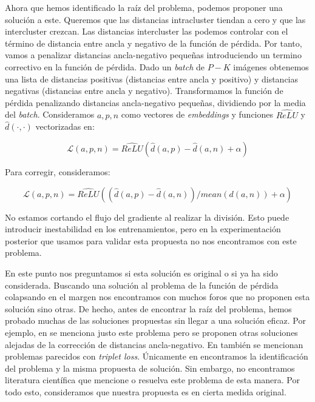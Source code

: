 Ahora que hemos identificado la raíz del problema, podemos proponer una solución a este. Queremos que las distancias intracluster tiendan a cero y que las intercluster crezcan. Las distancias intercluster las podemos controlar con el término de distancia entre ancla y negativo de la función de pérdida. Por tanto, vamos a penalizar distancias ancla-negativo pequeñas introduciendo un termino correctivo en la función de pérdida. Dado un \textit{batch} de $P-K$ imágenes obtenemos una lista de distancias positivas (distancias entre ancla y positivo) y distancias negativas (distancias entre ancla y negativo). Transformamos la función de pérdida penalizando distancias ancla-negativo pequeñas, dividiendo por la media del \textit{batch}. Consideramos $a, p, n$ como vectores de \textit{embeddings} y funciones $\widehat{ReLU}$ y $\widehat{d}(\cdot, \cdot)$ vectorizadas en:

\begin{equation}
    \mathcal{L}(a, p, n) = \widehat{ReLU}(\widehat{d}(a, p) - \widehat{d}(a, n) + \alpha)
\end{equation}

Para corregir, consideramos:

\begin{equation}
    \mathcal{L}(a, p, n) = \widehat{ReLU}((\widehat{d}(a, p) - \widehat{d}(a, n)) / mean(d(a, n)) + \alpha)
\end{equation}

No estamos cortando el flujo del gradiente al realizar la división. Esto puede introducir inestabilidad en los entrenamientos, pero en la experimentación posterior que usamos para validar esta propuesta no nos encontramos con este problema.


En este punto nos preguntamos si esta solución es original o si ya ha sido considerada. Buscando una solución al problema de la función de pérdida colapsando en el margen nos encontramos con muchos foros que no proponen esta solución sino otras. De hecho, antes de encontrar la raíz del problema, hemos probado muchas de las soluciones propuestas sin llegar a una solución eficaz. Por ejemplo, en \cite{informatica:respuesta_erronea_problema} se menciona justo este problema pero se proponen otras soluciones alejadas de la corrección de distancias ancla-negativo. En \cite{informatica:github_issue_problema_tripletloss} también se mencionan problemas parecidos con \textit{triplet loss}. Únicamente en \cite{informatica:solucion_triplet_loss} encontramos la identificación del problema y la misma propuesta de solución. Sin embargo, no encontramos literatura científica que mencione o resuelva este problema de esta manera. Por todo esto, consideramos que nuestra propuesta es en cierta medida original.

